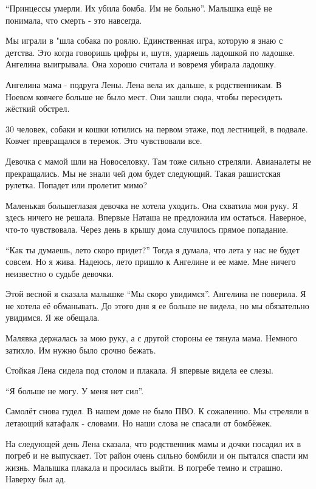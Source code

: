 \enquote{Принцессы  умерли. Их убила  бомба. Им не больно}. Малышка ещё  не понимала,
что смерть - это навсегда. 

Мы играли в "шла собака по роялю. Единственная игра, которую я знаю с детства.
Это когда говоришь цифры и,  шутя, ударяешь ладошкой по ладошке. Ангелина
выигрывала. Она хорошо считала и вовремя убирала ладошку. 

Ангелина мама -  подруга Лены. Лена вела их дальше,  к родственникам. В Ноевом
ковчеге больше не было мест. Они зашли сюда, чтобы пересидеть жёсткий обстрел. 

30 человек, собаки и кошки ютились на первом этаже, под лестницей, в подвале.
Ковчег превращался в теремок. Это чувствовали все. 

Девочка с мамой шли на Новоселовку. Там тоже сильно стреляли. Авианалеты не
прекращались. Мы не знали чей дом будет следующий.  Такая рашистская рулетка.
Попадет или пролетит мимо?

Маленькая большеглазая девочка не хотела уходить. Она схватила моя руку.  Я
здесь ничего не решала. Впервые Наташа не предложила им  остаться. Наверное,
что-то чувствовала. Через день в крышу дома случилось прямое попадание. 

\enquote{Как ты думаешь, лето скоро придет?} Тогда я думала, что лета у нас не будет
совсем. Но я жива. Надеюсь, лето  пришло к Ангелине и ее маме. Мне ничего
неизвестно о судьбе девочки. 

Этой весной я сказала малышке \enquote{Мы скоро увидимся}. Ангелина не поверила. Я не
хотела её обманывать. До этого дня  я ее больше  не видела, но мы обязательно
увидимся. Я же обещала. 

Малявка держалась за мою руку, а с другой стороны ее тянула мама. Немного
затихло.  Им нужно было срочно  бежать. 

Стойкая Лена сидела под столом и плакала.  Я впервые видела ее слезы. 

\enquote{Я больше не могу. У меня  нет сил}. 

Самолёт снова гудел. В  нашем доме  не было  ПВО. К сожалению. Мы стреляли в
летающий  катафалк -   словами. Но наши слова не спасали от бомбёжек. 

На следующей день Лена сказала, что родственник мамы и дочки посадил их в
погреб и не выпускает. Тот  район очень сильно бомбили и он пытался спасти им
жизнь. Малышка плакала и просилась выйти. В погребе  темно и страшно. Наверху
был ад.
